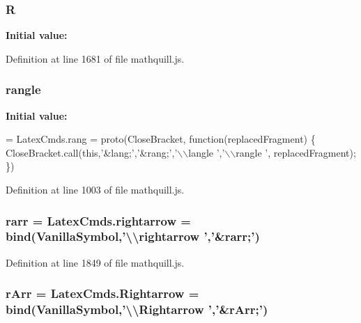 \subsubsection[{R}]{ R}\label{mathquill_8js_ad59d4a3e93a6900844c3bd437c89b3f9}
{\bfseries Initial value\-:}


Definition at line 1681 of file mathquill.\-js.

\subsubsection[{rangle}]{ rangle}\label{mathquill_8js_af9282e557491423ba7c64d69b9e8fab4}
{\bfseries Initial value\-:}
\begin{DoxyCode}
= LatexCmds.rang = proto(CloseBracket, \textcolor{keyword}{function}(replacedFragment) \{
  CloseBracket.call(\textcolor{keyword}{this},\textcolor{stringliteral}{'&lang;'},\textcolor{stringliteral}{'&rang;'},\textcolor{stringliteral}{'\(\backslash\)\(\backslash\)langle '},\textcolor{stringliteral}{'\(\backslash\)\(\backslash\)rangle '}, replacedFragment);
\})
\end{DoxyCode}


Definition at line 1003 of file mathquill.\-js.

\subsubsection[{rarr}]{ rarr = Latex\-Cmds.\-rightarrow = {\bf bind}({\bf Vanilla\-Symbol},'\textbackslash{}\textbackslash{}rightarrow ','\&rarr;')}\label{mathquill_8js_a9fdd63cc6ba460dfcbf8e9feacc6c246}


Definition at line 1849 of file mathquill.\-js.

\subsubsection[{r\-Arr}]{ r\-Arr = Latex\-Cmds.\-Rightarrow = {\bf bind}({\bf Vanilla\-Symbol},'\textbackslash{}\textbackslash{}Rightarrow ','\&r\-Arr;')}\label{mathquill_8js_ad808bb205097d0ff1a90bd3abc13ad32}


